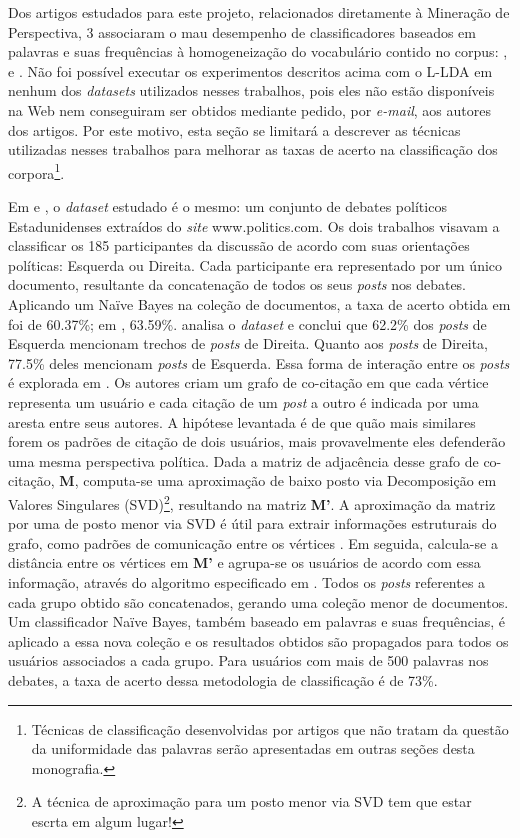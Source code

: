 Dos artigos estudados para este projeto, relacionados diretamente à Mineração de Perspectiva, 3 associaram o mau desempenho de classificadores baseados em palavras e suas frequências à homogeneização do vocabulário contido no corpus: \cite{malouf-taking_sides}, \cite{aaai-politics} e \cite{efron}. Não foi possível executar os experimentos descritos acima com o L-LDA em nenhum dos \emph{datasets} utilizados nesses trabalhos, pois eles não estão disponíveis na Web nem conseguiram ser obtidos mediante pedido, por \emph{e-mail}, aos autores dos artigos. Por este motivo, esta seção se limitará a descrever as técnicas utilizadas nesses trabalhos para melhorar as taxas de acerto na classificação dos corpora\footnote{Técnicas de classificação desenvolvidas por artigos que não tratam da questão da uniformidade das palavras serão apresentadas em outras seções desta monografia.}.

Em \cite{malouf-taking_sides} e \cite{aaai-politcs}, o \emph{dataset} estudado é o mesmo: um conjunto de debates políticos Estadunidenses extraídos do \emph{site} www.politics.com. Os dois trabalhos visavam a classificar os 185 participantes da discussão de acordo com suas orientações políticas: Esquerda ou Direita. Cada participante era representado por um único documento, resultante da concatenação de todos os seus \emph{posts} nos debates. Aplicando um Naïve Bayes na coleção de documentos, a taxa de acerto obtida em \cite{aaai-politics} foi de 60.37\%; em \cite{malouf-takind_sides}, 63.59\%. \cite{aaai-politcs} analisa o \emph{dataset} e conclui que 62.2\% dos \emph{posts} de Esquerda mencionam trechos de \emph{posts} de Direita. Quanto aos \emph{posts} de Direita, 77.5\% deles mencionam \emph{posts} de Esquerda. Essa forma de interação entre os \emph{posts} é explorada em \cite{malouf-taking_sides}. Os autores criam um grafo de co-citação em que cada vértice representa um usuário e cada citação de um \emph{post} a outro é indicada por uma aresta entre seus autores. A hipótese levantada é de que quão mais similares forem os padrões de citação de dois usuários, mais provavelmente eles defenderão uma mesma perspectiva política. Dada a matriz de adjacência desse grafo de co-citação, \textbf{M}, computa-se uma aproximação de baixo posto via Decomposição em Valores Singulares (SVD)\footnote{A técnica de aproximação para um posto menor via SVD tem que estar escrta em algum lugar!}, resultando na matriz \textbf{M'}. A aproximação da matriz por uma de posto menor via SVD é útil para extrair informações estruturais do grafo, como padrões de comunicação entre os vértices \cite{drineas}. Em seguida, calcula-se a distância entre os vértices em \textbf{M'} e agrupa-se os usuários de acordo com essa informação, através do algoritmo especificado em \cite{hoon}. Todos os \emph{posts} referentes a cada grupo obtido são concatenados, gerando uma coleção menor de documentos. Um classificador Naïve Bayes, também baseado em palavras e suas frequências, é aplicado a essa nova coleção e os resultados obtidos são propagados para todos os usuários associados a cada grupo. Para usuários com mais de 500 palavras nos debates, a taxa de acerto dessa metodologia de classificação é de 73\%.




